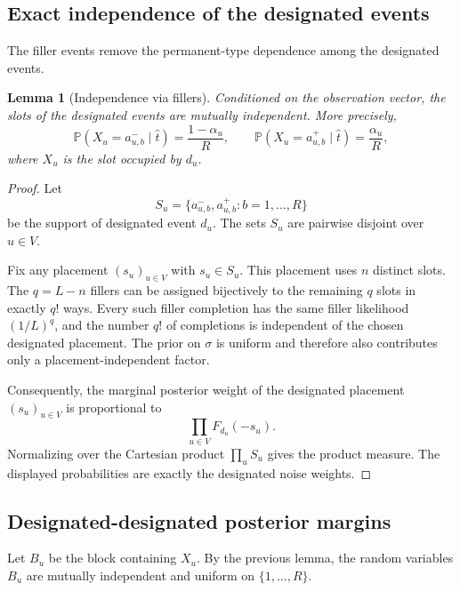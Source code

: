 \documentclass[11pt]{article}
\newtheorem{lemma}{Lemma}
\newcommand{\Prb}{\mathbb{P}}
\begin{document}
\subsection{Exact independence of the designated events}

The filler events remove the permanent-type dependence among the designated events.

\begin{lemma}[Independence via fillers]
Conditioned on the observation vector, the slots of the designated events are mutually independent.  More precisely,
\begin{equation}
  \Prb(X_u=a_{u,b}^-\mid \hat t)=\frac{1-\alpha_u}{R},
  \qquad
  \Prb(X_u=a_{u,b}^+\mid \hat t)=\frac{\alpha_u}{R},
\end{equation}
where $X_u$ is the slot occupied by $d_u$.
\end{lemma}

\begin{proof}
Let
\begin{equation}
  S_u=\{a_{u,b}^-,a_{u,b}^+: b=1,
\ldots,R\}
\end{equation}
be the support of designated event $d_u$.  The sets $S_u$ are pairwise disjoint over $u\in V$.

Fix any placement $(s_u)_{u\in V}$ with $s_u\in S_u$.  This placement uses $n$ distinct slots.  The $q=L-n$ fillers can be assigned bijectively to the remaining $q$ slots in exactly $q!$ ways.  Every such filler completion has the same filler likelihood $(1/L)^q$, and the number $q!$ of completions is independent of the chosen designated placement.  The prior on $\sigma$ is uniform and therefore also contributes only a placement-independent factor.

Consequently, the marginal posterior weight of the designated placement $(s_u)_{u\in V}$ is proportional to
\begin{equation}
  \prod_{u\in V} F_{d_u}(-s_u).
\end{equation}
Normalizing over the Cartesian product $\prod_u S_u$ gives the product measure.  The displayed probabilities are exactly the designated noise weights.
\end{proof}

\subsection{Designated-designated posterior margins}

Let $B_u$ be the block containing $X_u$.  By the previous lemma, the random variables $B_u$ are mutually independent and uniform on $\{1,\ldots,R\}$.
\end{document}
